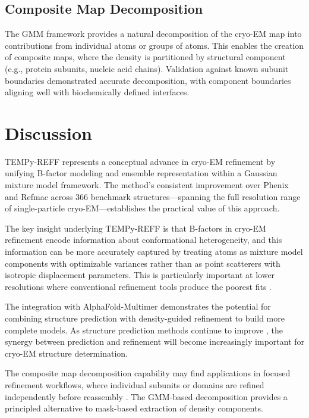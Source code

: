 \documentclass[11pt]{article}
\begin{document}
\subsection{Composite Map Decomposition}

The GMM framework provides a natural decomposition of the cryo-EM map into contributions from individual atoms or groups of atoms. This enables the creation of composite maps, where the density is partitioned by structural component (e.g., protein subunits, nucleic acid chains). Validation against known subunit boundaries demonstrated accurate decomposition, with component boundaries aligning well with biochemically defined interfaces.

\section{Discussion}

TEMPy-REFF represents a conceptual advance in cryo-EM refinement by unifying B-factor modeling and ensemble representation within a Gaussian mixture model framework. The method's consistent improvement over Phenix and Refmac across 366 benchmark structures---spanning the full resolution range of single-particle cryo-EM---establishes the practical value of this approach.

The key insight underlying TEMPy-REFF is that B-factors in cryo-EM refinement encode information about conformational heterogeneity, and this information can be more accurately captured by treating atoms as mixture model components with optimizable variances rather than as point scatterers with isotropic displacement parameters. This is particularly important at lower resolutions where conventional refinement tools produce the poorest fits \citep{afonine2018,murshudov2011}.

The integration with AlphaFold-Multimer demonstrates the potential for combining structure prediction with density-guided refinement to build more complete models. As structure prediction methods continue to improve \citep{jumper2021}, the synergy between prediction and refinement will become increasingly important for cryo-EM structure determination.

The composite map decomposition capability may find applications in focused refinement workflows, where individual subunits or domains are refined independently before reassembly \citep{zivanov2018}. The GMM-based decomposition provides a principled alternative to mask-based extraction of density components.
\end{document}
